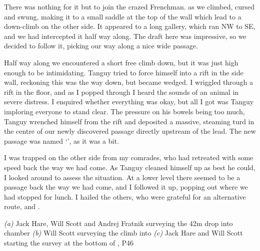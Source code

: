 There was nothing for it but to join the crazed Frenchman.  as we climbed, cursed and swung, making it to a small saddle at the top of the wall which lead to a down-climb on the other side. It appeared to a long gallery, which ran NW to SE, and we had intercepted it half way along. The draft here was impressive, so we decided to follow it, picking our way along a nice wide passage.
 
Half way along we encountered a short free climb down, but it was just high enough to be intimidating. Tanguy tried to force himself into a rift in the side wall, reckoning this was the way down, but became wedged. I wriggled through a rift in the floor, and as I popped through I heard the sounds of an animal in severe distress. I enquired whether everything was okay, but all I got was Tanguy imploring everyone to stand clear. The pressure on his bowels being too much, Tanguy wrenched himself from the rift and deposited a massive, steaming turd in the centre of our newly discovered passage directly upstream of the lead. The new passage was named `', as it was a bit.
 
I was trapped on the other side from my comrades, who had retreated with some speed back the way we had come. As Tanguy cleaned himself up as best he could, I looked around to assess the situation. At a lower level there seemed to be a passage back the way we had come, and I followed it up, popping out where we had stopped for lunch. I hailed the others, who were grateful for an alternative route, and .

\begin{pagefigure}
    \centering
    \begin{subfigure}[t]{0.393\textwidth}
        \centering
        \caption{} \label{Hall of the Mountain King}
    \end{subfigure}
    \hfill
    \begin{subfigure}[t]{0.59\textwidth}
        \centering
        \caption{} \label{Colony}
    \end{subfigure}

    \vspace{0.3cm}
    \begin{subfigure}[t]{\textwidth}
    \centering
        \caption{} \label{Bottom of Blue Danube}
    \end{subfigure}
    
    \caption{
    \textit{(a)} Jack Hare, Will Scott and Andrej Fratnik surveying the 42m drop into \protect{} chamber
    \textit{(b)} Will Scott surveying the climb into \protect{}
    \textit{(c)} Jack Hare and Will Scott starting the survey at the bottom of \protect{}, P46 }

\end{pagefigure}



